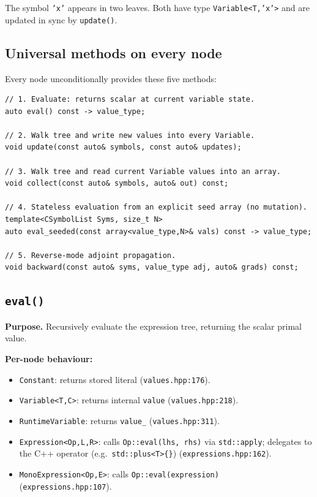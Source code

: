 \documentclass[11pt,a4paper]{article}
\newcommand{\code}[1]{\texttt{#1}}
\begin{document}
\noindent The symbol \code{'x'} appears in two leaves.  Both have type
\code{Variable<T,'x'>} and are updated in sync by \code{update()}.

\subsection{Universal methods on every node}

Every node unconditionally provides these five methods:

\begin{tcolorbox}[defbox={Method overview}]
\begin{lstlisting}
// 1. Evaluate: returns scalar at current variable state.
auto eval() const -> value_type;

// 2. Walk tree and write new values into every Variable.
void update(const auto& symbols, const auto& updates);

// 3. Walk tree and read current Variable values into an array.
void collect(const auto& symbols, auto& out) const;

// 4. Stateless evaluation from an explicit seed array (no mutation).
template<CSymbolList Syms, size_t N>
auto eval_seeded(const array<value_type,N>& vals) const -> value_type;

// 5. Reverse-mode adjoint propagation.
void backward(const auto& syms, value_type adj, auto& grads) const;
\end{lstlisting}
\end{tcolorbox}

\subsection{\texttt{eval()}}
\label{sec:eval}

\textbf{Purpose.} Recursively evaluate the expression tree, returning the
scalar primal value.

\medskip\noindent\textbf{Per-node behaviour:}
\begin{itemize}
  \item \code{Constant}: returns stored literal (\texttt{values.hpp:176}).
  \item \code{Variable<T,C>}: returns internal \code{value} (\texttt{values.hpp:218}).
  \item \code{RuntimeVariable}: returns \code{value\_} (\texttt{values.hpp:311}).
  \item \code{Expression<Op,L,R>}: calls \code{Op::eval(lhs, rhs)} via
    \code{std::apply}; delegates to the C++ operator
    (e.g.\ \code{std::plus<T>\{\}}) (\texttt{expressions.hpp:162}).
  \item \code{MonoExpression<Op,E>}: calls \code{Op::eval(expression)}
    (\texttt{expressions.hpp:107}).
\end{itemize}
\end{document}
